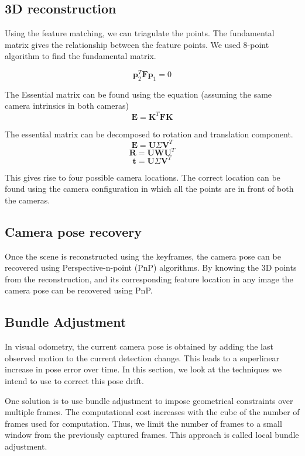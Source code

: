 \documentclass[12pt,twocolumn,letterpaper]{article}
\begin{document}
\subsection{3D reconstruction}
Using the feature matching, we can triagulate the points. The fundamental matrix gives the relationship between the feature points. We used 8-point algorithm to find the fundamental matrix.

$$ \textbf{p}_2^T \textbf{Fp}_1 = 0 $$

The Essential matrix can be found using the equation (assuming the same camera intrinsics in both cameras)
$$ \textbf{E} = \textbf{K}^T \textbf{F} \textbf{K} $$

The essential matrix can be decomposed to rotation and translation component.
$$ \textbf{E} = \textbf{U}\Sigma \textbf{V}^T $$
$$ \textbf{R} = \textbf{U} \textbf{W} \textbf{U}^T $$
$$ \textbf{t} = \textbf{U} \Sigma \textbf{V}^T $$

This gives rise to four possible camera locations. The correct location can be found using the camera configuration in which all the points are in front of both the cameras.

\subsection{Camera pose recovery}
Once the scene is reconstructed using the keyframes, the camera pose can be recovered using Perspective-n-point (PnP) algorithms. By knowing the 3D points from the reconstruction, and its corresponding feature location in any image the camera pose can be recovered using PnP.

\subsection{Bundle Adjustment}
In visual odometry, the current camera pose is obtained by adding the last observed motion to the current detection change. This leads to a superlinear increase in pose error over time. In this section, we look at the techniques we intend to use to correct this pose drift.

One solution is to use bundle adjustment to impose geometrical constraints over multiple
frames. The computational cost increases with the cube of the number of frames used for computation. Thus, we limit the number of frames to a small window from the previously captured frames. This approach is called local bundle adjustment.
\end{document}
